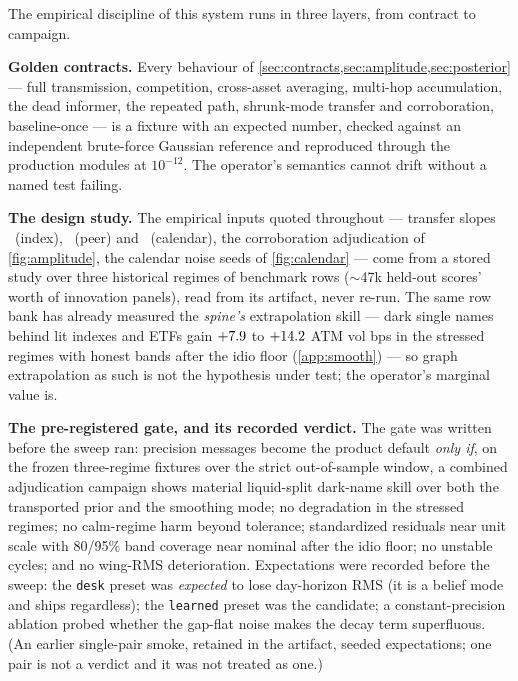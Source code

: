 \documentclass[11pt]{article}
\begin{document}
The empirical discipline of this system runs in three layers, from
contract to campaign.

\textbf{Golden contracts.}  Every behaviour of
\cref{sec:contracts,sec:amplitude,sec:posterior} --- full transmission,
competition, cross-asset averaging, multi-hop accumulation, the dead
informer, the repeated path, shrunk-mode transfer and corroboration,
baseline-once --- is a fixture with an expected number, checked against
an independent brute-force Gaussian reference and reproduced through
the production modules at $10^{-12}$.  The operator's semantics cannot
drift without a named test failing.

\textbf{The design study.}  The empirical inputs quoted throughout ---
transfer slopes \gmrhoindex\ (index), \gmrhopeer\ (peer) and
\gmcallevel\ (calendar), the corroboration adjudication of
\cref{fig:amplitude}, the calendar noise seeds of
\cref{fig:calendar} --- come from a stored study over three historical
regimes of benchmark rows ($\sim$47k held-out scores' worth of
innovation panels), read from its artifact, never re-run.  The same
row bank has already measured the \emph{spine's} extrapolation skill
--- dark single names behind lit indexes and ETFs gain
$+7.9$ to $+14.2$ ATM vol bps in the stressed
regimes with honest bands after the idio floor
(\cref{app:smooth}) --- so graph extrapolation as such is not the
hypothesis under test; the operator's marginal value is.

\textbf{The pre-registered gate, and its recorded verdict.}
\label{sec:gate}
The gate was written before the sweep ran: precision messages become
the product default \emph{only if}, on the
frozen three-regime fixtures over the strict out-of-sample window, a
combined adjudication campaign shows material liquid-split dark-name
skill over both the transported prior and the smoothing mode; no
degradation in the stressed regimes; no calm-regime harm beyond
tolerance; standardized residuals near unit scale with 80/95\% band
coverage near nominal after the idio floor; no unstable cycles; and no
wing-RMS deterioration.  Expectations were recorded before the sweep:
the \texttt{desk} preset was \emph{expected} to lose day-horizon RMS
(it is a belief mode and ships regardless); the \texttt{learned}
preset was the candidate; a constant-precision ablation probed whether
the gap-flat noise makes the decay term superfluous.  (An earlier
single-pair smoke, retained in the artifact, seeded expectations; one
pair is not a verdict and it was not treated as one.)
\end{document}
